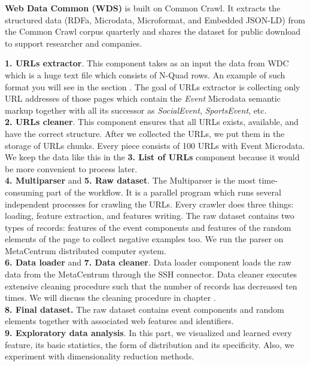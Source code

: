 \textbf{Web Data Common (WDS)} is built on Common Crawl. It extracts the structured data (RDFa, Microdata, Microformat, and Embedded JSON-LD) from the Common Crawl corpus quarterly and shares the dataset for public download to support researcher and companies. 

\textbf{1. URLs extractor}. This component takes as an input the data from WDC which is a huge text file which consists of N-Quad rows. An example of such format you will see in the section . The goal of URLs extractor is collecting only URL addresses of those pages which contain the \textit{Event} Microdata semantic markup together with all its successor as \textit{SocialEvent}, \textit{SportsEvent}, etc.\\

\textbf{2. URLs cleaner}. This component ensures that all URLs exists, available, and have the correct structure. After we collected the URLs, we put them in the storage of URLs chunks. Every piece consists of 100 URLs with Event Microdata. We keep the data like this in the \textbf{3. List of URLs} component because it would be more convenient to process later.\\

\textbf{4. Multiparser} and \textbf{5. Raw dataset}. The Multiparser is the most time-consuming part of the workflow. It is a parallel program which runs several independent processes for crawling the URLs. Every crawler does three things: loading, feature extraction, and features writing. The raw dataset contains two types of records: features of the event components and features of the random elements of the page to collect negative examples too. We run the parser on MetaCentrum distributed computer system.\\

\textbf{6. Data loader} and \textbf{7. Data cleaner}. Data loader component loads the raw data from the MetaCentrum through the SSH connector.  Data cleaner executes extensive cleaning procedure such that the number of records has decreased ten times. We will discuss the cleaning procedure in chapter .\\

\textbf{8. Final dataset.} The raw dataset contains event components and random elements together with associated web features and identifiers.\\

\textbf{9. Exploratory data analysis}. In this part, we visualized and learned every feature, its basic statistics, the form of distribution and its specificity. Also, we experiment with dimensionality reduction methods.  \\

